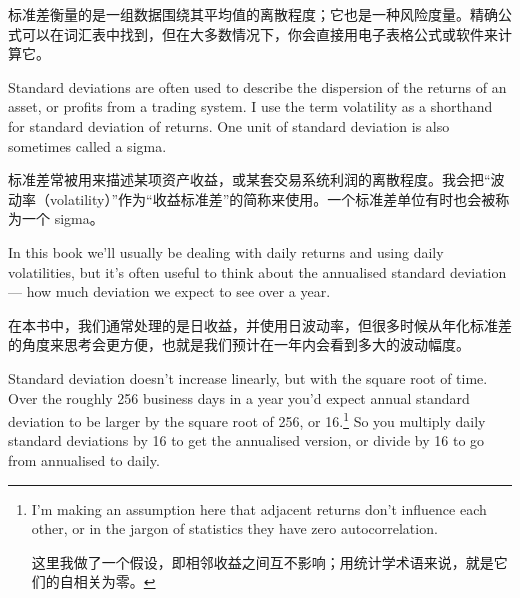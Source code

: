 \begin{chineseblock}标准差衡量的是一组数据围绕其平均值的离散程度；它也是一种风险度量。精确公式可以在词汇表中找到，但在大多数情况下，你会直接用电子表格公式或软件来计算它。\end{chineseblock}

\bipairgap

\begin{englishblock} Standard deviations are often used to describe the dispersion of the returns of an asset, or profits from a trading system. I use the term volatility as a shorthand for standard deviation of returns. One unit of standard deviation is also sometimes called a sigma. \end{englishblock}

\begin{chineseblock}标准差常被用来描述某项资产收益，或某套交易系统利润的离散程度。我会把“波动率（volatility）”作为“收益标准差”的简称来使用。一个标准差单位有时也会被称为一个 sigma。 \end{chineseblock}

\bipairgap

\begin{englishblock} In this book we'll usually be dealing with daily returns and using daily volatilities, but it's often useful to think about the annualised standard deviation --- how much deviation we expect to see over a year. \end{englishblock}

\begin{chineseblock}在本书中，我们通常处理的是日收益，并使用日波动率，但很多时候从年化标准差的角度来思考会更方便，也就是我们预计在一年内会看到多大的波动幅度。\end{chineseblock}

\bipairgap

\begin{englishblock} Standard deviation doesn't increase linearly, but with the square root of time. Over the roughly 256 business days in a year you'd expect annual standard deviation to be larger by the square root of 256, or 16.\footnote{I'm making an assumption here that adjacent returns don't influence each other, or in the jargon of statistics they have zero autocorrelation. \par 这里我做了一个假设，即相邻收益之间互不影响；用统计学术语来说，就是它们的自相关为零。} So you multiply daily standard deviations by 16 to get the annualised version, or divide by 16 to go from annualised to daily. \end{englishblock}


